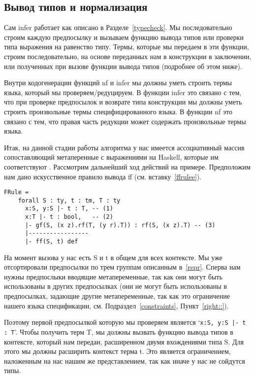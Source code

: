 \subsection{Вывод типов и нормализация}\label{nf_infer}
Сам infer работает как описано в Разделе~\ref{typecheck}. Мы последовательно строим каждую предпосылку и вызываем функцию вывода типов или проверки типа выражения на равенство типу. Термы, которые мы передаем в эти функции, строим последовательно, на основе переданных нам в конструкции в заключении, или полученных при вызове функции вывода типов (подробнее об этом ниже).


Внутри кодогенерации функций nf и infer мы должны уметь строить термы языка, который мы проверяем/редуцируем. В функции infer это связано с тем, что при проверке предпосылок и возврате типа конструкции мы должны уметь строить произвольные термы специфицированного языка. В функции nf это связано с тем, что правая часть редукции может содержать произвольные термы языка.

Итак, на данной стадии работы алгоритма у нас имеется ассоциативный массив сопоставляющий метаперенные с выражениями на Haskell, которые им соответствуют
. Рассмотрим дальнейший ход действий на примере. Предположим нам дано искусственное правило вывода ff (см. вставку~\ref{ffrulee}).

\begin{lstlisting}[label={ffrulee}, caption={Искусственное правило вывода для конструкции ff},captionpos=b, frame=single, float, floatplacement=H]
FRule =
    forall S : ty, t : tm, T : ty
      x:S, y:S |- t : T, -- (1)
      x:T |- t : bool,   -- (2)
      |- gf(S, (x z).rf(T, (y r).T)) : rf(S, (x z).T) -- (3)
      |-----------------
      |- ff(S, t) def
\end{lstlisting}

На момент вызова у нас есть S и t в общем для всех контексте. Мы уже отсортировали предпосылки по трем группам описанным в~\ref{repr}. Сперва нам нужны предпослыки вводящие метапеременные, так как они могут быть использованы в других предпосылках (они не могут быть использованы в предпосылках, задающие другие метапеременные, так как это ограничение нашего языка спецификации, см. Подраздел~\ref{constraints}, Пункт~\ref{right::}).

Поэтому первой предпосылкой которую мы проверяем является `\lstinline{x:S, y:S |- t : T}'. Чтобы получить терм T, мы должны вызвать функцию вывода типов в контексте, который нам передан, расширенном двумя вхождениями типа S. Для этого мы должны расширить контекст терма t. Это является ограничением, наложенным на нас нашим же представлением, так как иначе у нас не сойдутся типы.

